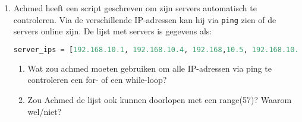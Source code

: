 \begin{enumerate}
\item Achmed heeft een script geschreven om zijn servers automatisch te controleren. Via de verschillende IP-adressen kan hij via \texttt{ping} zien of de servers online zijn. De lijst met servers is gegevens als:
\begin{lstlisting}[language=python]
server_ips = [192.168.10.1, 192.168.10.4, 192.168,10.5, 192.168.10.10, 192.168.10.55, 192.168.10.56 ]
\end{lstlisting}
	\begin{enumerate}
        \item Wat zou achmed moeten gebruiken om alle IP-adressen via ping te controleren een for- of een while-loop?
        \item Zou Achmed de lijst ook kunnen doorlopen met een range(57)? Waarom wel/niet?
	\end{enumerate}
\end{enumerate}

